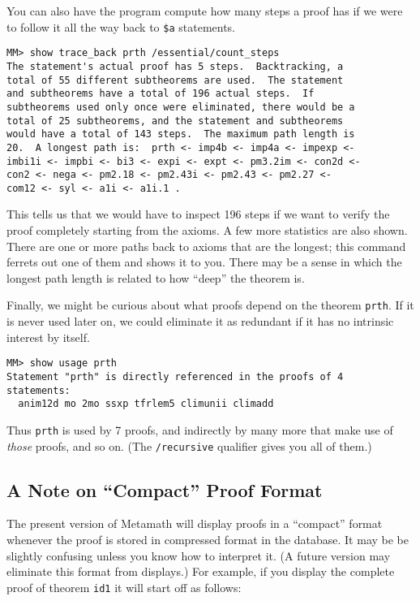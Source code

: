 You can also have the program compute how many steps a proof
has if we were to follow it all the way back to
\texttt{\$a} statements.

\begin{verbatim}
MM> show trace_back prth /essential/count_steps
The statement's actual proof has 5 steps.  Backtracking, a
total of 55 different subtheorems are used.  The statement
and subtheorems have a total of 196 actual steps.  If
subtheorems used only once were eliminated, there would be a
total of 25 subtheorems, and the statement and subtheorems
would have a total of 143 steps.  The maximum path length is
20.  A longest path is:  prth <- imp4b <- imp4a <- impexp <-
imbi1i <- impbi <- bi3 <- expi <- expt <- pm3.2im <- con2d <-
con2 <- nega <- pm2.18 <- pm2.43i <- pm2.43 <- pm2.27 <-
com12 <- syl <- a1i <- a1i.1 .
\end{verbatim}

This tells us that we would have to inspect 196 steps if we want to
verify the proof completely starting from the axioms.  A few more
statistics are also shown.  There are one or more paths back to axioms
that are the longest; this command ferrets out one of them and shows it
to you.  There may be a sense in which the longest path length is
related to how ``deep'' the theorem is.

Finally, we might be curious about what proofs depend on the theorem
\texttt{prth}.  If it is never used later on, we could eliminate it as
redundant if it has no intrinsic interest by itself.

\begin{verbatim}
MM> show usage prth
Statement "prth" is directly referenced in the proofs of 4
statements:
  anim12d mo 2mo ssxp tfrlem5 climunii climadd
\end{verbatim}

Thus \texttt{prth} is used by 7 proofs, and indirectly by many more that
make use of {\em those} proofs, and so on.  (The \texttt{/recursive}
qualifier gives you all of them.)

\subsection{A Note on ``Compact'' Proof Format}

The present version of Metamath will display proofs in a ``compact''
format whenever the proof is stored in compressed format in the database.  It
may be be slightly confusing unless you know how to interpret it.  (A
future version may eliminate this format from displays.)  For example,
if you display the complete proof of theorem \texttt{id1} it will start
off as follows:

